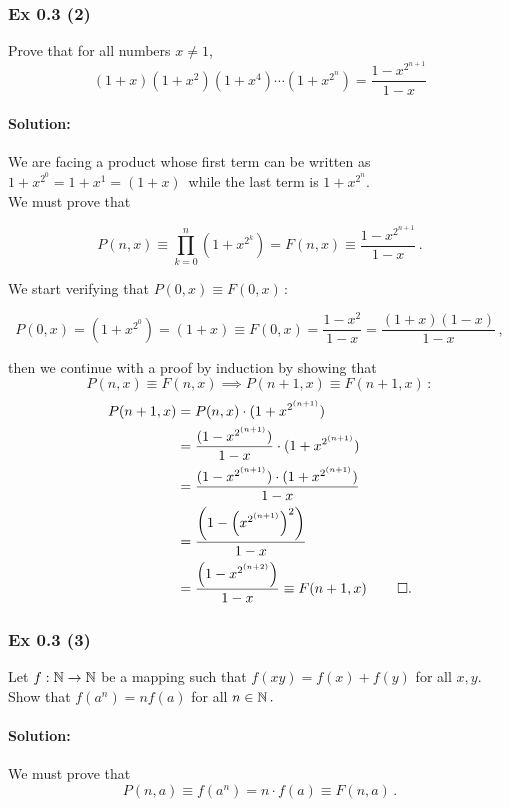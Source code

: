 {\subsubsection{Ex 0.3 (2)}\label{sec:Ex_0.3.2}
Prove that for all numbers $x \neq 1$,
$$ (1 + x)(1 + x^2)(1 + x^4)\cdots(1 + x^{2^{n}}) = \frac{1 - x^{2^{n + 1}}}{1 - x}$$

%
%
\paragraph{Solution:}{
We are facing a product whose first term can be written as $1 + x^{2^{0}} = 1 + x^{1} = (1+x)\,$ 
while the last term is $1 + x^{2^{n}}$.\\ We must prove that

$$P(n, x) \equiv \prod_{k=0}^{n} (1 + x^{2^{k}}) = F(n, x) \equiv \frac{1 - x^{2^{n + 1}}}{1 - x}\,.$$

We start verifying that $P(0, x) \equiv F(0, x)\,$:

$$   P(0, x) = (1 + x^{2^{0}}) = (1 + x) \equiv F(0, x) = \frac{1 - x^{2}}{1 - x} = \frac{(1 + x)(1 - x)}{1 - x}\,,$$

then we continue with a proof by induction by showing that $$P(n, x) \equiv F(n, x) \implies P(n+1, x) \equiv F(n+1, x)\,:$$ 
\begin{align*}
P(n+1, x) &= P(n, x) \cdot (1 + x^{2^{(n+1)}})\\
          &= \frac{(1 - x^{2^{(n + 1)}})}{1 - x} \cdot (1 + x^{2^{(n+1)}})\\
          &= \frac{  (1 - x^{2^{(n + 1)}})  \cdot (1 + x^{2^{(n+1)}}) }{1 - x} \\
          &= \frac{  \left(1 - {\left( x^{2^{(n + 1)}} \right)}^2 \right)  }{1 - x}\\
          &= \frac{  \left(1 - x^{2^{(n + 2)}} \right)  }{1 - x} \equiv F(n+1, x)\,\qed.
\end{align*}
}

\subsubsection{Ex 0.3 (3)}\label{sec:Ex_0.3.3}
Let $f: \mathbb{N} \rightarrow \mathbb{N}$ be a mapping such that $f(xy) = f(x) + f(y)$ for all $x, y$. 
Show that $f(a^n) = n f(a)$ for all $n \in \mathbb{N}\,.$ 
%
%
\paragraph{Solution:}{
We must prove that 
$$P(n, a) \equiv f(a^n) = n \cdot f(a) \equiv F(n, a)\,.$$

}}
